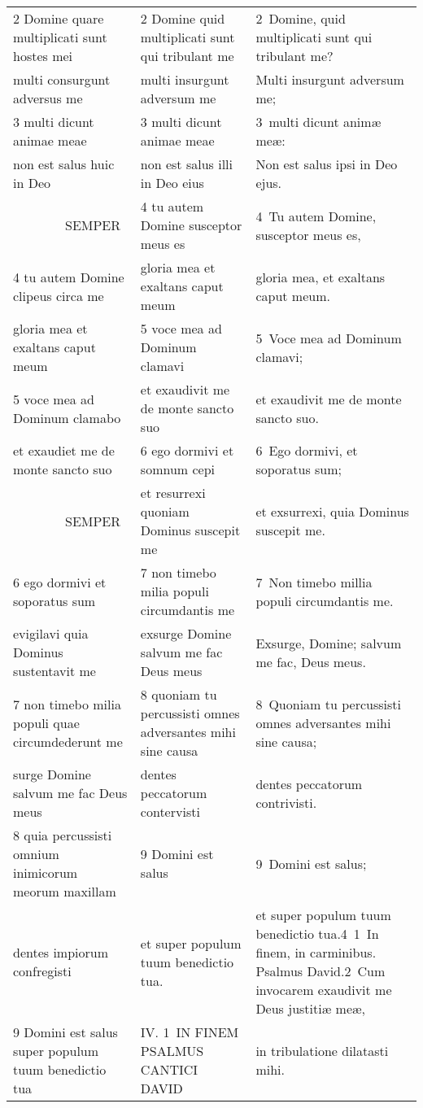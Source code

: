 \documentclass{article}
\begin{document}
\begin{longtable}{@{}p{}p{}p{}@{}}
2 Domine quare multiplicati sunt hostes mei	&	2 Domine quid multiplicati sunt qui tribulant me	&	2 Domine, quid multiplicati sunt qui tribulant me?	\\
multi consurgunt adversus me	&	multi insurgunt adversum me	&	Multi insurgunt adversum me;	\\
3 multi dicunt animae meae	&	3 multi dicunt animae meae	&	3 multi dicunt animæ meæ:	\\
non est salus huic in Deo	&	non est salus illi in Deo eius	&	Non est salus ipsi in Deo ejus.	\\
    SEMPER	&	4 tu autem Domine susceptor meus es	&	4 Tu autem Domine, susceptor meus es,	\\
4 tu autem Domine clipeus circa me	&	gloria mea et exaltans caput meum	&	gloria mea, et exaltans caput meum.	\\
gloria mea et exaltans caput meum	&	5 voce mea ad Dominum clamavi	&	5 Voce mea ad Dominum clamavi;	\\
5 voce mea ad Dominum clamabo	&	et exaudivit me de monte sancto suo	&	et exaudivit me de monte sancto suo.	\\
et exaudiet me de monte sancto suo	&	6 ego dormivi et somnum cepi	&	6 Ego dormivi, et soporatus sum;	\\
    SEMPER	&	et resurrexi quoniam Dominus suscepit me	&	et exsurrexi, quia Dominus suscepit me.	\\
6 ego dormivi et soporatus sum	&	7 non timebo milia populi circumdantis me	&	7 Non timebo millia populi circumdantis me.	\\
evigilavi quia Dominus sustentavit me	&	exsurge Domine salvum me fac Deus meus	&	Exsurge, Domine; salvum me fac, Deus meus.	\\
7 non timebo milia populi quae circumdederunt me	&	8 quoniam tu percussisti omnes adversantes mihi sine causa	&	8 Quoniam tu percussisti omnes adversantes mihi sine causa;	\\
surge Domine salvum me fac Deus meus	&	dentes peccatorum contervisti	&	dentes peccatorum contrivisti.	\\
8 quia percussisti omnium inimicorum meorum maxillam	&	9 Domini est salus	&	9 Domini est salus;	\\
dentes impiorum confregisti	&	et super populum tuum benedictio tua.	&	et super populum tuum benedictio tua.4 1 In finem, in carminibus. Psalmus David.2 Cum invocarem exaudivit me Deus justitiæ meæ,	\\
9 Domini est salus super populum tuum benedictio tua	&	IV. 1 IN FINEM PSALMUS CANTICI DAVID	&	in tribulatione dilatasti mihi.	\\

\end{longtable}
\end{document}
